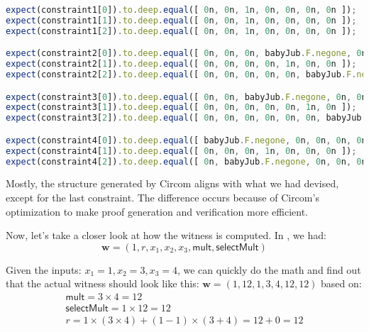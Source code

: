 \documentclass[../lecture-notes-148x210.tex]{subfiles}
\begin{document}
\begin{center}
    \begin{tcolorbox}[enhanced,
        width=1.0\textwidth,
        title={\textbf{test/Math.witness.test.ts}},
        coltitle=gray!25!black,
        attach boxed title to top center={yshift=-2mm,yshifttext=-1mm},
        boxed title style={size=small,colframe=gray!75!black,
        colback=Green!30!white,boxrule=1.5pt},
        top=-0.3cm,
        bottom=-0.3cm]
        \begin{lstlisting}[language=TypeScript,numbers=none,basicstyle=\scriptsize\ttfamily\scriptsize]
expect(constraint1[0]).to.deep.equal([ 0n, 0n, 1n, 0n, 0n, 0n, 0n ]);
expect(constraint1[1]).to.deep.equal([ 0n, 0n, 1n, 0n, 0n, 0n, 0n ]);
expect(constraint1[2]).to.deep.equal([ 0n, 0n, 1n, 0n, 0n, 0n, 0n ]);

expect(constraint2[0]).to.deep.equal([ 0n, 0n, 0n, babyJub.F.negone, 0n, 0n, 0n ]);
expect(constraint2[1]).to.deep.equal([ 0n, 0n, 0n, 0n, 1n, 0n, 0n ]);
expect(constraint2[2]).to.deep.equal([ 0n, 0n, 0n, 0n, 0n, babyJub.F.negone, 0n ]);

expect(constraint3[0]).to.deep.equal([ 0n, 0n, babyJub.F.negone, 0n, 0n, 0n, 0n ]);
expect(constraint3[1]).to.deep.equal([ 0n, 0n, 0n, 0n, 0n, 1n, 0n ]);
expect(constraint3[2]).to.deep.equal([ 0n, 0n, 0n, 0n, 0n, 0n, babyJub.F.negone ]);

expect(constraint4[0]).to.deep.equal([ babyJub.F.negone, 0n, 0n, 0n, 0n, 0n, 0n ]);
expect(constraint4[1]).to.deep.equal([ 0n, 0n, 0n, 1n, 0n, 0n, 0n ]);
expect(constraint4[2]).to.deep.equal([ 0n, babyJub.F.negone, 0n, 0n, 0n, 0n, 0n ]);
        \end{lstlisting}
    \end{tcolorbox}
\end{center}

Mostly, the structure generated by Circom aligns with what we had devised, except for the last constraint.
The difference occurs because of Circom's optimization to make proof generation and verification more efficient.

Now, let's take a closer look at how the witness is computed. In , we had:
\[ \mathbf{w} = (1, r, x_1, x_2, x_3, \mathsf{mult}, \mathsf{selectMult}) \]

Given the inputs: $x_1 = 1, x_2 = 3, x_3 = 4$, we can quickly do the math
and find out that the actual witness should look like this: $\mathbf{w} =
(1, 12, 1, 3, 4, 12, 12)$ based on:
\begin{gather*}
    \mathsf{mult} = 3 \times 4 = 12 \\
    \mathsf{selectMult} = 1 \times 12 = 12 \\
    r = 1 \times (3 \times 4) + (1 - 1) \times (3 + 4) = 12 + 0 = 12
\end{gather*}
\end{document}
